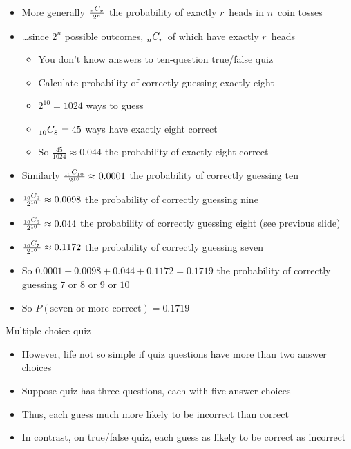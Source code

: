 \documentclass[xcolor=dvipsnames]{beamer}
\theoremstyle{definition}
\newcommand\ncr[2]{\tensor[_{#1}]C{_{#2}}}
\begin{document}
\begin{frame}
\begin{itemize}
\item More generally $\frac{\ncr{n}{r}}{2^n}$ the probability
of exactly $r$~heads in $n$~coin tosses
\item \dots since $2^n$ possible outcomes, $\ncr{n}{r}$
of which have exactly $r$~heads
\begin{example}
\begin{itemize}
\item You don't know answers to ten-question true/false quiz
\item Calculate probability of correctly guessing exactly eight
\item $2^{10}=1024$ ways to guess
\item $\ncr{10}{8}=45$ ways have exactly eight correct
\item So $\frac{45}{1024}\approx 0.044$ the probability
of exactly eight correct
\end{itemize}
\end{example}
\end{itemize}
\end{frame}

\begin{frame}
\begin{itemize}
\item Similarly
$\frac{\ncr{10}{10}}{2^{10}}\approx 0.0001$
the probability of correctly guessing ten
\item $\frac{\ncr{10}{9}}{2^{10}}\approx 0.0098$
the probability of correctly guessing nine
\item $\frac{\ncr{10}{8}}{2^{10}}\approx 0.044$
the probability of correctly guessing eight (see previous slide)
\item $\frac{\ncr{10}{7}}{2^{10}}\approx 0.1172$
the probability of correctly guessing seven
\item So $0.0001+0.0098+0.044+0.1172=0.1719$
the probability of correctly guessing $7$ or $8$ or $9$ or $10$
\item So $P\left(\text{seven or more correct}\right)=0.1719$
\end{itemize}
\end{frame}

\begin{frame}{Multiple choice quiz}
\begin{itemize}
\item However, life not so simple if quiz questions have
more than two answer choices
\item Suppose quiz has three questions, each with five answer choices
\item Thus, each guess much more likely to be incorrect than correct
\item In contrast, on true/false quiz, each guess as likely
to be correct as incorrect
\end{itemize}
\end{frame}
\end{document}

